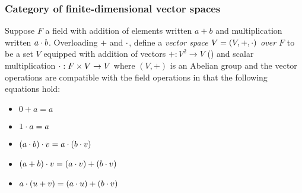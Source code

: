 \subsubsection{Category of finite-dimensional vector spaces}
\label{sec:categories-with-biproducts:fdvect}

\begin{definition}
Suppose $F$ a field with addition of elements written $a + b$ and multiplication written $a \cdot b$.
Overloading $+$ and $\cdot$, define a \emph{vector space $V = (V, +, \cdot)$ over $F$} to be a set $V$
equipped with addition of vectors $+: V^2 \to V$ () and scalar multiplication $\cdot: F \times V \to V$ where
$(V,+)$ is an Abelian group and the vector operations are compatible with the field operations in that the
following equations hold:
\begin{itemize}
\item $0 + a = a$
\item $1 \cdot a = a$
\item $(a \cdot b) \cdot v = a \cdot (b \cdot v)$
\item $(a + b) \cdot v = (a \cdot v) + (b \cdot v)$
\item $a \cdot (u + v) = (a \cdot u) + (b \cdot v)$
\end{itemize}
\end{definition}

%
